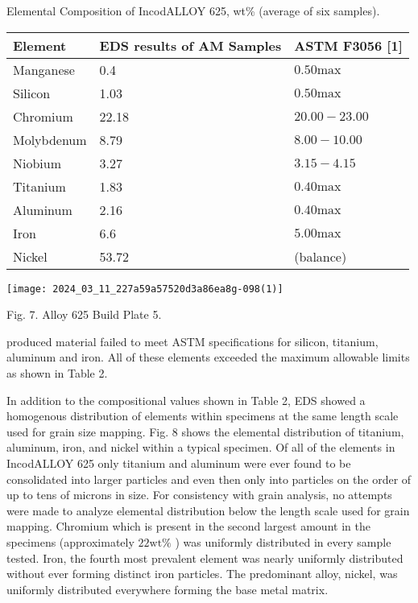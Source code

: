 \documentclass[10pt]{article}
\begin{document}
Elemental Composition of IncodALLOY 625, wt\% (average of six samples).

\begin{center}
\begin{tabular}{lll}
\hline
Element & EDS results of AM Samples & ASTM F3056 [1] \\
\hline
Manganese & 0.4 & $0.50 \mathrm{max}$ \\
Silicon & 1.03 & $0.50 \mathrm{max}$ \\
Chromium & 22.18 & $20.00-23.00$ \\
Molybdenum & 8.79 & $8.00-10.00$ \\
Niobium & 3.27 & $3.15-4.15$ \\
Titanium & 1.83 & $0.40 \mathrm{max}$ \\
Aluminum & 2.16 & $0.40 \mathrm{max}$ \\
Iron & 6.6 & $5.00 \mathrm{max}$ \\
Nickel & 53.72 & (balance) \\
\hline
\end{tabular}
\end{center}

\begin{center}
\texttt{[image: 2024\_03\_11\_227a59a57520d3a86ea8g-098(1)]}
\end{center}

Fig. 7. Alloy 625 Build Plate 5.

produced material failed to meet ASTM specifications for silicon, titanium, aluminum and iron. All of these elements exceeded the maximum allowable limits as shown in Table 2.

In addition to the compositional values shown in Table 2, EDS showed a homogenous distribution of elements within specimens at the same length scale used for grain size mapping. Fig. 8 shows the elemental distribution of titanium, aluminum, iron, and nickel within a typical specimen. Of all of the elements in IncodALLOY 625 only titanium and aluminum were ever found to be consolidated into larger particles and even then only into particles on the order of up to tens of microns in size. For consistency with grain analysis, no attempts were made to analyze elemental distribution below the length scale used for grain mapping. Chromium which is present in the second largest amount in the specimens (approximately $22 \mathrm{wt} \%$ ) was uniformly distributed in every sample tested. Iron, the fourth most prevalent element was nearly uniformly distributed without ever forming distinct iron particles. The predominant alloy, nickel, was uniformly distributed everywhere forming the base metal matrix.
\end{document}
